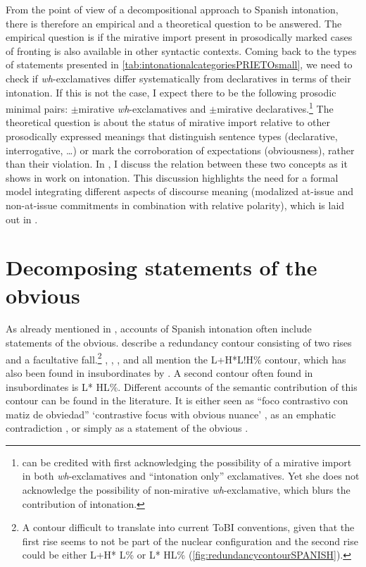 From the point of view of a decompositional approach to Spanish 
intonation, there is therefore an empirical and a theoretical question to be answered. The empirical question is if the mirative import present in prosodically marked cases of fronting is also available in other syntactic contexts. Coming back to the types of statements presented in \autoref{tab:intonationalcategoriesPRIETOsmall}, we need to check if 
\textit{wh}-exclamatives differ systematically from declaratives in terms of their intonation. If this is not the case, I expect there to be the following prosodic minimal pairs: $\pm$mirative \textit{wh}-exclamatives and $\pm$mirative declaratives.\footnote{\citet{Rett.2011} can be credited with first acknowledging the possibility of a mirative import in both \textit{wh}-exclamatives and ``intonation only'' exclamatives. Yet she does not acknowledge the possibility of non-mirative \textit{wh}-exclamative, which blurs the contribution of intonation.} The theoretical question is about the status of mirative import relative to other prosodically expressed meanings that distinguish sentence types (declarative, interrogative, \ldots) or mark the corroboration of expectations (obviousness), rather than their violation. In , I discuss the relation between these two concepts as it shows in work on intonation. This discussion highlights the need for a formal model integrating different aspects of discourse meaning (modalized at-issue and non-at-issue commitments in combination with relative polarity), which is laid out in .



\section{Decomposing statements of the obvious}
\label{ch:3.2}

As already mentioned in , accounts of Spanish intonation often include statements of the obvious. \citet{BeckmanETAL.2002} describe a redundancy contour consisting of two rises and a facultative fall.\footnote{A contour difficult to translate into current ToBI conventions, given that the first rise seems to not be part of the nuclear configuration and the second rise could be either L+H* L\% or L* HL\% (\autoref{fig:redundancycontourSPANISH}).} \citet[277]{EstebasVilaplanaPrieto.2008}, \citet{EstebasVilaplanaPrieto.2010}, \citet{Prieto2009-2013}, and \citet{HualdePrieto2015} all mention the L+H*L!H\% contour, which has also been found in insubordinates by \citet{ElviraGarcia.2016}. A second contour often found in insubordinates is L* HL\%. Different accounts of the semantic contribution of this contour can be found in the literature. It is either seen as ``foco contrastivo con matiz de obviedad'' `contrastive focus with obvious nuance' \citep[277]{EstebasVilaplanaPrieto.2008}, as an emphatic contradiction \citep[369]{HualdePrieto2015}, or simply as a statement of the obvious \citep{TorreiraGrice.2018}. 

